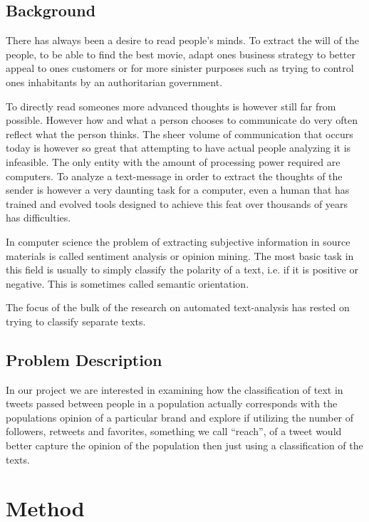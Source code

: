 \documentclass[a4paper,12pt]{report}
\begin{document}
\section{Background}

There has always been a desire to read people's minds.
To extract the will of the people, to be able to find the best movie, adapt ones business strategy to better appeal to ones customers or for more sinister purposes such as trying to control ones inhabitants by an authoritarian government.

To directly read someones more advanced thoughts is however still far from possible.
However how and what a person chooses to communicate do very often reflect what the person thinks.
The sheer volume of communication that occurs today is however so great that attempting to have actual people analyzing it is infeasible. 
The only entity with the amount of processing power required are computers. 
To analyze a text-message in order to extract the thoughts of the sender is however a very daunting task for a computer, even a human that has trained and evolved tools designed to achieve this feat over thousands of years has difficulties.

In computer science the problem of extracting subjective information in source materials is called sentiment analysis or opinion mining. 
The most basic task in this field is usually to simply classify the polarity of a text, i.e. if it is positive or negative. 
This is sometimes called semantic orientation. 

The focus of the bulk of the research on automated text-analysis has rested on trying to classify separate texts.

\section{Problem Description}

In our project we are interested in examining how the classification of text in tweets passed between people in a population actually corresponds with the populations opinion of a particular brand and explore if utilizing the number of followers, retweets and favorites, something we call ``reach'', of a tweet would better capture the opinion of the population then just using a classification of the texts. 

\chapter{Method}
\end{document}

